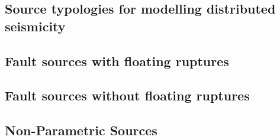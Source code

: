 \subsection{Source typologies for modelling distributed seismicity}


\subsection{Fault sources with floating ruptures}


\subsection{Fault sources without floating ruptures}


\subsection{Non-Parametric Sources}

